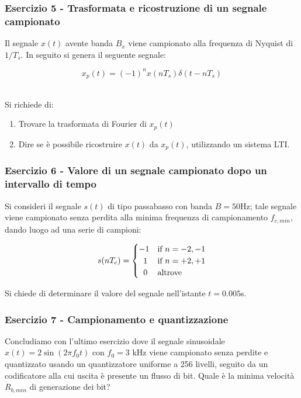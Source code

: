 \documentclass[../main.tex]{subfiles}
\begin{document}

\subsubsection{Esercizio 5 - Trasformata e ricostruzione di un segnale campionato}

Il segnale $x(t)$ avente banda $B_x$ viene campionato alla frequenza di Nyquist di $1/T_s$. In seguito si genera il seguente segnale:

\[ x_p(t) = (-1)^n x(nT_s)\delta(t - nT_s) \]\

Si richiede di:

\begin{enumerate}
	\item[\textbf{-}] Trovare la trasformata di Fourier di $x_p(t)$
	\item[\textbf{-}] Dire se è possibile ricostruire $x(t)$ da $x_p(t)$, utilizzando un sistema LTI.
\end{enumerate}


\subsubsection{Esercizio 6 - Valore di un segnale campionato dopo un intervallo di tempo}

Si consideri il segnale $s(t)$ di tipo passabasso con banda $B = 50$Hz; tale segnale viene campionato senza perdita alla minima frequenza di campionamento $f_{\unit{c,min}}$, dando luogo ad una serie di campioni:

\[ s(nT_c)=  \begin{cases} 
-1 & \text{if } n = -2,-1 \\
\hspace{5.5pt}1 & \text{if } n = +2,+1 \\
\hspace{5.5pt}0 & \text{altrove}
\end{cases} \]


Si chiede di determinare il valore del segnale nell’istante $t= 0.005$s.


\subsubsection{Esercizio 7 - Campionamento e quantizzazione}

Concludiamo con l'ultimo esercizio dove il segnale sinusoidale $x(t) = 2 \sin(2\pi f_0 t)$ con $f_0 = 3$ kHz viene campionato senza perdite e quantizzato usando un quantizzatore uniforme a 256 livelli, seguito da un codificatore alla cui uscita è presente un flusso di bit. Quale è la minima velocità  $R_{\unit{b,min}}$ di generazione dei bit?
\end{document}
